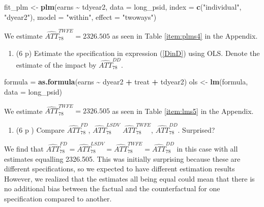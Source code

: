 \documentclass[
]{article}
\newenvironment{Shaded}{\begin{snugshade}}{\end{snugshade}}
\newcommand{\AttributeTok}[1]{\textcolor[rgb]{0.13,0.29,0.53}{#1}}
\newcommand{\FunctionTok}[1]{\textcolor[rgb]{0.13,0.29,0.53}{\textbf{#1}}}
\newcommand{\NormalTok}[1]{#1}
\newcommand{\OtherTok}[1]{\textcolor[rgb]{0.56,0.35,0.01}{#1}}
\newcommand{\SpecialCharTok}[1]{\textcolor[rgb]{0.81,0.36,0.00}{\textbf{#1}}}
\newcommand{\StringTok}[1]{\textcolor[rgb]{0.31,0.60,0.02}{#1}}
\providecommand{\tightlist}{%
  \setlength{\itemsep}{0pt}\setlength{\parskip}{0pt}}
\begin{document}
\begin{enumerate}
\begin{Shaded}
\begin{Highlighting}[]
\NormalTok{fit\_plm }\OtherTok{\textless{}{-}} \FunctionTok{plm}\NormalTok{(earns }\SpecialCharTok{\textasciitilde{}}\NormalTok{ tdyear2, }
              \AttributeTok{data =}\NormalTok{ long\_psid, }
              \AttributeTok{index =} \FunctionTok{c}\NormalTok{(}\StringTok{"individual"}\NormalTok{, }\StringTok{"dyear2"}\NormalTok{), }
              \AttributeTok{model =} \StringTok{"within"}\NormalTok{, }
              \AttributeTok{effect =} \StringTok{"twoways"}\NormalTok{)}
\end{Highlighting}
\end{Shaded}
\end{enumerate}

We estimate \(\widehat{ATT}_{78}^{TWFE} = 2326.505\) as seen in Table
\ref{item:plms4} in the Appendix.

\begin{enumerate}
\def\labelenumi{\arabic{enumi}.}
\setcounter{enumi}{4}
\tightlist
\item
  (6 p) Estimate the specification in expression (\ref{DinD}) using OLS.
  Denote the estimate of the impact by
  \(\widehat{ATT}_{78}^{DD}\).\label{item:dd}
\end{enumerate}

\begin{Shaded}
\begin{Highlighting}[]
\NormalTok{formula }\OtherTok{=} \FunctionTok{as.formula}\NormalTok{(earns }\SpecialCharTok{\textasciitilde{}}\NormalTok{ dyear2 }\SpecialCharTok{+}\NormalTok{ treat }\SpecialCharTok{+}\NormalTok{ tdyear2)}
\NormalTok{ols }\OtherTok{\textless{}{-}} \FunctionTok{lm}\NormalTok{(formula, }\AttributeTok{data =}\NormalTok{ long\_psid)}
\end{Highlighting}
\end{Shaded}

We estimate \(\widehat{ATT}_{78}^{TWFE} = 2326.505\) as seen in Table
\ref{item:lms5} in the Appendix.

\begin{enumerate}
\def\labelenumi{\arabic{enumi}.}
\setcounter{enumi}{5}
\tightlist
\item
  (6 p ) Compare \(\widehat{ATT}_{78}^{FD}\),
  \(\widehat{ATT}_{78}^{LSDV}\) \(\widehat{ATT}_{78}^{TWFE}\),
  \(\widehat{ATT}_{78}^{DD}\). Surprised?
\end{enumerate}

We find that
\(\widehat{ATT}_{78}^{FD} = \widehat{ATT}_{78}^{LSDV} = \widehat{ATT}_{78}^{TWFE} = \widehat{ATT}_{78}^{DD}\)
in this case with all estimates equalling 2326.505. This was initially
surprising because these are different specifications, so we expected to
have different estimation results However, we realized that the
estimates all being equal could mean that there is no additional bias
between the factual and the counterfactual for one specification
compared to another.
\end{document}
